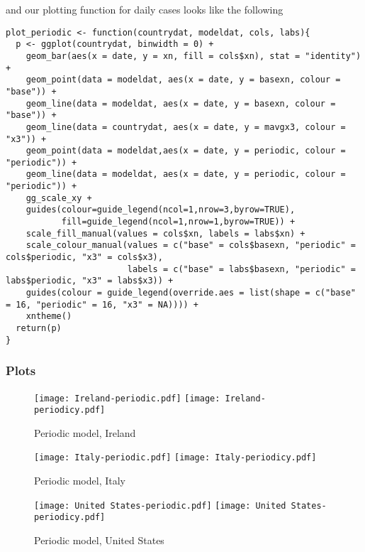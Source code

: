 and our plotting function for daily cases looks like the following

\begin{lstlisting}[frame=single, caption = {Plot Periodic Model}]
plot_periodic <- function(countrydat, modeldat, cols, labs){
  p <- ggplot(countrydat, binwidth = 0) + 
    geom_bar(aes(x = date, y = xn, fill = cols$xn), stat = "identity") + 
    geom_point(data = modeldat, aes(x = date, y = basexn, colour = "base")) + 
    geom_line(data = modeldat, aes(x = date, y = basexn, colour = "base")) +
    geom_line(data = countrydat, aes(x = date, y = mavgx3, colour = "x3")) +
    geom_point(data = modeldat,aes(x = date, y = periodic, colour = "periodic")) +
    geom_line(data = modeldat, aes(x = date, y = periodic, colour = "periodic")) +
    gg_scale_xy + 
    guides(colour=guide_legend(ncol=1,nrow=3,byrow=TRUE),
           fill=guide_legend(ncol=1,nrow=1,byrow=TRUE)) +
    scale_fill_manual(values = cols$xn, labels = labs$xn) +
    scale_colour_manual(values = c("base" = cols$basexn, "periodic" = cols$periodic, "x3" = cols$x3), 
                        labels = c("base" = labs$basexn, "periodic" = labs$periodic, "x3" = labs$x3)) +
    guides(colour = guide_legend(override.aes = list(shape = c("base" = 16, "periodic" = 16, "x3" = NA)))) +
    xntheme()
  return(p)
}
\end{lstlisting}

\subsubsection{Plots}

\begin{figure}[H]
  \texttt{[image: Ireland-periodic.pdf]} \label{fig:ireland-periodic}
\endminipage\hfill
{}
  \texttt{[image: Ireland-periodicy.pdf]} \label{fig:ireland-periodicy}
\endminipage
\caption{Periodic model, Ireland}
\end{figure}

\begin{figure}[H]
  \texttt{[image: Italy-periodic.pdf]} \label{fig:italy-periodic}
\endminipage\hfill
{}
  \texttt{[image: Italy-periodicy.pdf]} \label{fig:italy-periodicy}
\endminipage
\caption{Periodic model, Italy}
\end{figure}

\begin{figure}[H]
  \texttt{[image: United States-periodic.pdf]} \label{fig:usa-periodic}
\endminipage\hfill
{}
  \texttt{[image: United States-periodicy.pdf]} \label{fig:usa-periodicy}
\endminipage
\caption{Periodic model, United States}
\end{figure}

